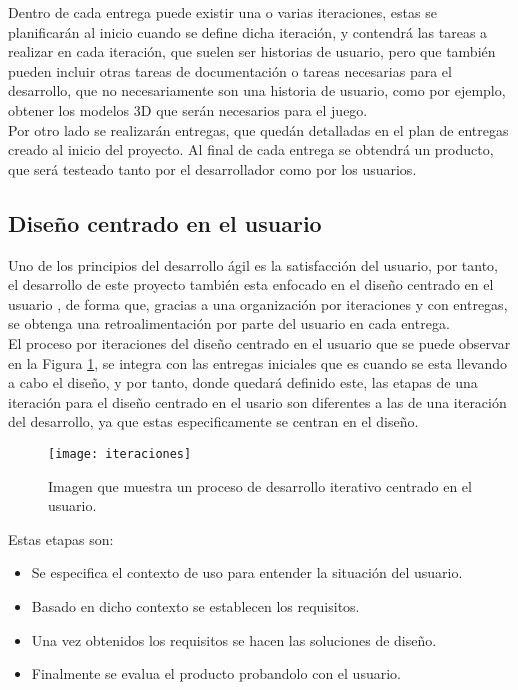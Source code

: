 Dentro de cada entrega puede existir una o varias iteraciones, estas se planificarán al inicio cuando se define dicha iteración, y contendrá las tareas a realizar en cada iteración, que suelen ser historias de usuario, pero que también pueden incluir otras tareas de documentación o tareas necesarias para el desarrollo, que no necesariamente son una historia de usuario, como por ejemplo, obtener los modelos 3D que serán necesarios para el juego.\\

Por otro lado se realizarán entregas, que quedán detalladas en el plan de entregas creado al inicio del proyecto. Al final de cada entrega se obtendrá un producto, que será testeado tanto por el desarrollador como por los usuarios.

\subsection{Diseño centrado en el usuario}
Uno de los principios del desarrollo ágil es la satisfacción del usuario, por tanto, el desarrollo de este proyecto también esta enfocado en el diseño centrado en el usuario \cite{sanchez}, de forma que, gracias a una organización por iteraciones y con entregas, se obtenga una retroalimentación por parte del usuario en cada entrega.\\

El proceso por iteraciones del diseño centrado en el usuario que se puede observar en la Figura \ref{figura-iteraciones}, se integra con las entregas iniciales que es cuando se esta llevando a cabo el diseño, y por tanto, donde quedará definido este, las etapas de una iteración para el diseño centrado en el usario son diferentes a las de una iteración del desarrollo, ya que estas especificamente se centran en el diseño.

\begin{figure}[h]
  \centering
  \texttt{[image: iteraciones]}
  \caption{Imagen que muestra un proceso de desarrollo iterativo centrado en el usuario.\protect\footnotemark}
  \label{figura-iteraciones}
\end{figure}


\newpage

Estas etapas son:
\begin{itemize}
  \item Se especifica el contexto de uso para entender la situación del usuario.
  \item Basado en dicho contexto se establecen los requisitos.
  \item Una vez obtenidos los requisitos se hacen las soluciones de diseño.
  \item Finalmente se evalua el producto probandolo con el usuario.
\end{itemize}

